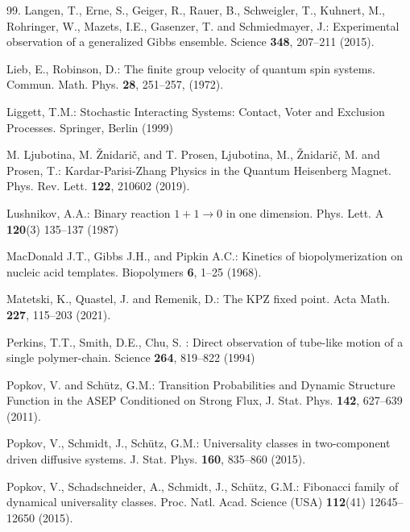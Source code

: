 \documentclass[12pt]{article}
\begin{document}
\begin{thebibliography}{99.}
Langen, T., Erne, S., Geiger, R., Rauer, B.,
Schweigler, T., Kuhnert, M., Rohringer, W.,
Mazets, I.E., Gasenzer, T. and Schmiedmayer, J.:
Experimental observation of a generalized Gibbs ensemble.
Science \textbf{348}, 207--211 (2015).

Lieb, E., Robinson, D.:
The finite group velocity of quantum spin systems.
Commun. Math. Phys. \textbf{28}, 251--257, (1972).

Liggett, T.M.:
Stochastic Interacting Systems: Contact, Voter and Exclusion Processes.
Springer, Berlin (1999)

M. Ljubotina, M. \v{Z}nidari\v{c}, and T. Prosen,
Ljubotina, M., \v{Z}nidari\v{c}, M. and Prosen, T.:
Kardar-Parisi-Zhang Physics in the Quantum Heisenberg Magnet.
Phys. Rev. Lett. \textbf{122}, 210602 (2019).

Lushnikov, A.A.: 
Binary reaction $1 + 1 \to 0$ in one dimension.
Phys. Lett. A \textbf{120}(3) 135--137 (1987)

MacDonald J.T., Gibbs J.H., and Pipkin A.C.:
Kinetics of biopolymerization on nucleic acid templates.
Biopolymers \textbf{6}, 1--25 (1968).

Matetski, K., Quastel, J. and Remenik, D.:
The KPZ fixed point.
Acta Math. \textbf{227}, 115--203 (2021).

Perkins, T.T., Smith, D.E., Chu, S. :
Direct observation of tube-like motion of a single polymer-chain.
Science {\bf 264}, 819--822 (1994)

Popkov, V. and Sch\"utz, G.M.:
Transition Probabilities and Dynamic Structure Function in the ASEP Conditioned on Strong Flux,
J. Stat. Phys. \textbf {142}, 627--639 (2011).

Popkov, V., Schmidt, J., Sch\"utz, G.M.:
Universality classes in two-component driven diffusive systems.
J. Stat. Phys. \textbf{160}, 835--860 (2015).

Popkov, V., Schadschneider, A., Schmidt, J., Sch\"utz, G.M.:
Fibonacci family of dynamical universality classes.
Proc. Natl. Acad. Science (USA) \textbf{112}(41) 12645--12650 (2015).


\end{thebibliography}
\end{document}
